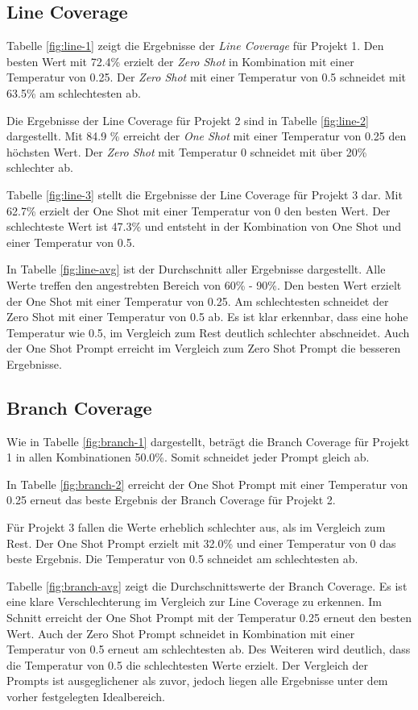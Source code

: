 \subsection{Line Coverage}
Tabelle \ref{fig:line-1} zeigt die Ergebnisse der \textit{Line Coverage} für Projekt 1. Den besten Wert mit 72.4\% erzielt der \textit{Zero Shot} in Kombination mit einer Temperatur von 0.25. Der \textit{Zero Shot} mit einer Temperatur von 0.5 schneidet mit 63.5\% am schlechtesten ab.

Die Ergebnisse der Line Coverage für Projekt 2 sind in Tabelle \ref{fig:line-2} dargestellt. Mit 84.9 \% erreicht der \textit{One Shot} mit einer Temperatur von 0.25 den höchsten Wert. Der \textit{Zero Shot} mit Temperatur 0 schneidet mit über 20\% schlechter ab.

Tabelle \ref{fig:line-3} stellt die Ergebnisse der Line Coverage für Projekt 3 dar. Mit 62.7\% erzielt der One Shot mit einer Temperatur von 0 den besten Wert. Der schlechteste Wert ist 47.3\% und entsteht in der Kombination von One Shot und einer Temperatur von 0.5.

In Tabelle \ref{fig:line-avg} ist der Durchschnitt aller Ergebnisse dargestellt. Alle Werte treffen den angestrebten Bereich von 60\% - 90\%. Den besten Wert erzielt der One Shot mit einer Temperatur von 0.25. Am schlechtesten schneidet der Zero Shot mit einer Temperatur von 0.5 ab. Es ist klar erkennbar, dass eine hohe Temperatur wie 0.5, im Vergleich zum Rest deutlich schlechter abschneidet. Auch der One Shot Prompt erreicht im Vergleich zum Zero Shot Prompt die besseren Ergebnisse.


\subsection{Branch Coverage}
Wie in Tabelle \ref{fig:branch-1} dargestellt, beträgt die Branch Coverage für Projekt 1 in allen Kombinationen 50.0\%. Somit schneidet jeder Prompt gleich ab.

In Tabelle \ref{fig:branch-2} erreicht der One Shot Prompt mit einer Temperatur von 0.25 erneut das beste Ergebnis der Branch Coverage für Projekt 2.

Für Projekt 3 fallen die Werte erheblich schlechter aus, als im Vergleich zum Rest. Der One Shot Prompt erzielt mit 32.0\% und einer Temperatur von 0 das beste Ergebnis. Die Temperatur von 0.5 schneidet am schlechtesten ab.

Tabelle \ref{fig:branch-avg} zeigt die Durchschnittswerte der Branch Coverage. Es ist eine klare Verschlechterung im Vergleich zur Line Coverage zu erkennen. Im Schnitt erreicht der One Shot Prompt mit der Temperatur 0.25 erneut den besten Wert. Auch der Zero Shot Prompt schneidet in Kombination mit einer Temperatur von 0.5 erneut am schlechtesten ab. Des Weiteren wird deutlich, dass die Temperatur von 0.5 die schlechtesten Werte erzielt. Der Vergleich der Prompts ist ausgeglichener als zuvor, jedoch liegen alle Ergebnisse unter dem vorher festgelegten Idealbereich. 


